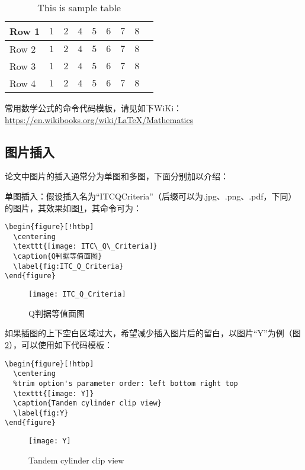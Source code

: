 \begin{table}[!htbp]
    \centering
    \renewcommand{\arraystretch}{1.2}
    \begin{tabular}{lcccccccc}
        \hline\hline
        Row 1 & $1$ & $2$ & $4$ & $5$ & $6$ & $7$ & $8$\\
        \hline
        Row 2 & $1$ & $2$ & $4$ & $5$ & $6$ & $7$ & $8$\\
        \hline
        Row 3 & $1$ & $2$ & $4$ & $5$ & $6$ & $7$ & $8$\\
        \hline
        Row 4 & $1$ & $2$ & $4$ & $5$ & $6$ & $7$ & $8$\\
        \hline\hline
    \end{tabular}
    \caption{This is sample table}
    \label{tab:sample}
\end{table}

常用数学公式的命令代码模板，请见如下WiKi：\url{https://en.wikibooks.org/wiki/LaTeX/Mathematics}

\subsection{图片插入}

论文中图片的插入通常分为单图和多图，下面分别加以介绍：

单图插入：假设插入名为“ITC\textunderscore Q\textunderscore Criteria”（后缀可以为.jpg、.png、.pdf，下同）的图片，其效果如图\ref{fig:ITC_Q_Criteria}，其命令可为：
\begin{verbatim}
\begin{figure}[!htbp]
  \centering
  \texttt{[image: ITC\_Q\_Criteria]}
  \caption{Q判据等值面图}
  \label{fig:ITC_Q_Criteria}
\end{figure}
\end{verbatim}
\begin{figure}[!htbp]
  \centering
  \texttt{[image: ITC\_Q\_Criteria]}
  \caption{Q判据等值面图}
  \label{fig:ITC_Q_Criteria}
\end{figure}

如果插图的上下空白区域过大，希望减少插入图片后的留白，以图片“Y”为例（图\ref{fig:Y}），可以使用如下代码模板：
\begin{verbatim}
\begin{figure}[!htbp]
  \centering
  %trim option's parameter order: left bottom right top
  \texttt{[image: Y]}
  \caption{Tandem cylinder clip view}
  \label{fig:Y}
\end{figure}
\end{verbatim}
\begin{figure}[!htbp]
  \centering
  \texttt{[image: Y]}
  \caption{Tandem cylinder clip view}
  \label{fig:Y}
\end{figure}

